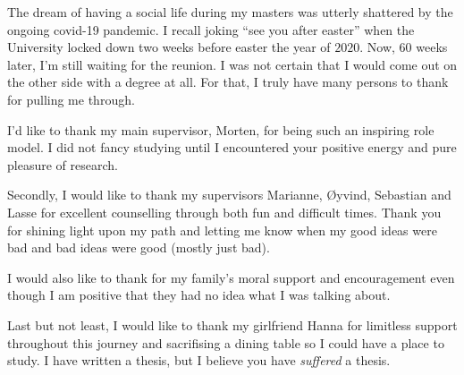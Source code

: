 
The dream of having a social life during my masters was utterly shattered by the ongoing covid-19 pandemic. I recall joking ``see you after easter'' when the University locked down two weeks before easter the year of $2020$. Now, $60$ weeks later, I'm still waiting for the reunion.
I was not certain that I would come out on the other side with a degree at all. For that, I truly have many persons to thank for pulling me through.


I'd like to thank my main supervisor, Morten, for being such an inspiring role model. I did not fancy studying until I encountered your positive energy and pure pleasure of research.


Secondly, I would like to thank my supervisors Marianne, Øyvind, Sebastian and Lasse for excellent counselling through both fun and difficult times. Thank you for shining light upon my path and letting me know when my good ideas were bad and bad ideas were good (mostly just bad).


I would also like to thank for my family's moral support and encouragement even though I am positive that they had no idea what I was talking about.


Last but not least, I would like to thank my girlfriend Hanna for limitless support throughout this journey and sacrifising a dining table so I could have a place to study. I have written a thesis, but I believe you have \emph{suffered} a thesis.

